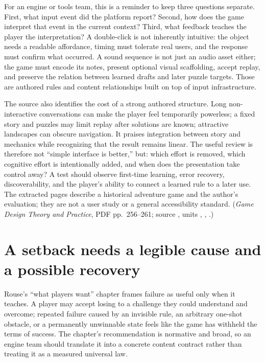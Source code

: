 For an engine or tools team, this is a reminder to keep three questions separate. First, what input event did the platform report? Second, how does the game interpret that event in the current context? Third, what feedback teaches the player the interpretation? A double-click is not inherently intuitive: the object needs a readable affordance, timing must tolerate real users, and the response must confirm what occurred. A sound sequence is not just an audio asset either; the game must encode its notes, present optional visual scaffolding, accept replay, and preserve the relation between learned drafts and later puzzle targets. Those are authored rules and content relationships built on top of input infrastructure.

The source also identifies the cost of a strong authored structure. Long non-interactive conversations can make the player feel temporarily powerless; a fixed story and puzzles may limit replay after solutions are known; attractive landscapes can obscure navigation. It praises integration between story and mechanics while recognizing that the result remains linear. The useful review is therefore not ``simple interface is better,'' but: which effort is removed, which cognitive effort is intentionally added, and when does the presentation take control away? A test should observe first-time learning, error recovery, discoverability, and the player's ability to connect a learned rule to a later use. The extracted pages describe a historical adventure game and the author's evaluation; they are not a user study or a general accessibility standard. (\emph{Game Design Theory and Practice}, PDF pp.~256--261; source , units , , .)

\section{A setback needs a legible cause and a possible recovery}\label{06-engine-ii-ch047-a-setback-needs-a-legible-cause-and-a-possible-recovery}

\hypertarget{06-engine-ii-ch047-a-setback-needs-a-legible-cause-and-a-possible-recovery}{}

Rouse's ``what players want'' chapter frames failure as useful only when it teaches. A player may accept losing to a challenge they could understand and overcome; repeated failure caused by an invisible rule, an arbitrary one-shot obstacle, or a permanently unwinnable state feels like the game has withheld the terms of success. The chapter's recommendation is normative and broad, so an engine team should translate it into a concrete content contract rather than treating it as a measured universal law.

